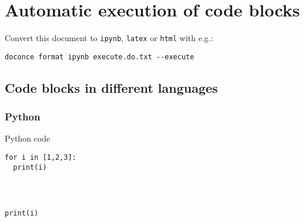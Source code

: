 \documentclass[%
oneside,                 %
final,                   %
chapterprefix=true,      %
open=right,              %
10pt]{book}
\begin{document}

\newcommand{\exercisesection}[1]{\subsection*{#1}}





\chapter{Automatic execution of code blocks}

Convert this document to \texttt{ipynb}, \texttt{latex} or \texttt{html} with e.g.:



\begin{Verbatim}[numbers=none,fontsize=\fontsize{9pt}{9pt},baselinestretch=0.95]
doconce format ipynb execute.do.txt --execute

\end{Verbatim}


\section{Code blocks in different languages}
\subsection{Python}

Python code




\begin{Verbatim}[numbers=none,fontsize=\fontsize{9pt}{9pt},baselinestretch=0.95]
for i in [1,2,3]:
  print(i)

\end{Verbatim}

\begin{Verbatim}[numbers=none,fontsize=\fontsize{9pt}{9pt},baselinestretch=0.95]



\end{Verbatim}



\begin{Verbatim}[numbers=none,fontsize=\fontsize{9pt}{9pt},baselinestretch=0.95]
print(i)

\end{Verbatim}
\end{document}
